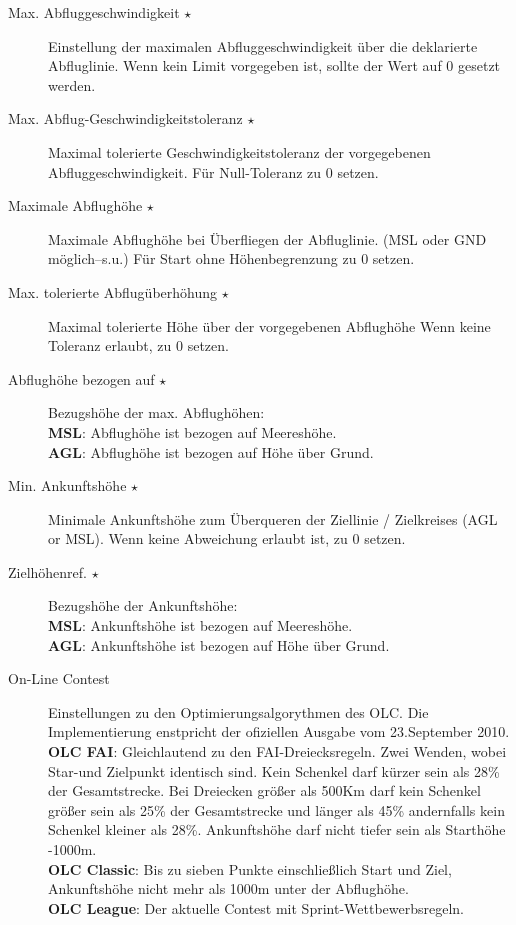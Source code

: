\begin{description}
\item[Max. Abfluggeschwindigkeit $\star$] Einstellung der maximalen Abfluggeschwindigkeit über die deklarierte Abfluglinie.
   Wenn kein Limit vorgegeben ist, sollte der Wert auf $0$ gesetzt werden.
\item[Max. Abflug-Geschwindigkeitstoleranz $\star$] Maximal tolerierte Geschwindigkeitstoleranz der vorgegebenen Abfluggeschwindigkeit.
   Für Null-Toleranz zu $0$ setzen.
\item[Maximale Abflughöhe $\star$]  Maximale Abflughöhe bei Überfliegen der Abfluglinie.
   (MSL oder GND möglich--s.u.) Für Start ohne Höhenbegrenzung zu $0$ setzen.
\item[Max. tolerierte Abflugüberhöhung $\star$]  Maximal tolerierte Höhe über der vorgegebenen Abflughöhe
   Wenn keine Toleranz erlaubt, zu $0$ setzen.
\item[Abflughöhe bezogen auf $\star$]  Bezugshöhe der max. Abflughöhen:\\
    {\bf MSL}: Abflughöhe ist bezogen auf Meereshöhe.\\
    {\bf AGL}: Abflughöhe ist bezogen auf Höhe über Grund.
\item[Min. Ankunftshöhe $\star$]  Minimale Ankunftshöhe zum Überqueren der Ziellinie / Zielkreises
    (AGL or MSL). Wenn keine Abweichung erlaubt ist, zu $0$ setzen.
\item[Zielhöhenref. $\star$] Bezugshöhe der Ankunftshöhe:\\
    {\bf MSL}: Ankunftshöhe ist bezogen auf Meereshöhe.\\
    {\bf AGL}: Ankunftshöhe ist bezogen auf Höhe über Grund.
\item[On-Line Contest]  Einstellungen zu den Optimierungsalgorythmen des OLC.
   Die Implementierung enstpricht der ofiziellen Ausgabe vom 23.September 2010. \\
   {\bf OLC FAI}: Gleichlautend zu den FAI-Dreiecksregeln. Zwei Wenden, wobei Star-und Zielpunkt identisch sind.
   Kein Schenkel darf kürzer sein als 28\% der Gesamtstrecke. Bei Dreiecken größer als 500Km
   darf kein Schenkel größer sein als 25\% der Gesamtstrecke und länger als 45\% andernfalls kein
   Schenkel kleiner als 28\%. Ankunftshöhe darf nicht  tiefer sein als Starthöhe -1000m.\\
   {\bf OLC Classic}: Bis zu sieben Punkte einschließlich Start und Ziel, Ankunftshöhe nicht
   mehr als 1000m unter der Abflughöhe. \\
   {\bf OLC League}: Der aktuelle Contest mit Sprint-Wettbewerbsregeln.

\end{description}
